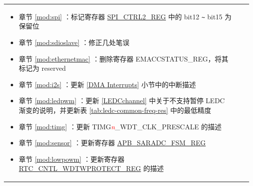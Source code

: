 \begin{longtable}[l]{ | m{2cm} | m{1.5cm} | m{12cm} | }
\begin{itemize}
    \item 章节 \ref{mod:spi} \textit{\nameref{mod:spi}}：标记寄存器 \hyperlink{regdesc:SPICTRL2REG}{SPI\_CTRL2\_REG} 中的 bit12 \verb+~+ bit15 为保留位 %

    \item 章节 \ref{mod:sdioslave} \textit{\nameref{mod:sdioslave}}：修正几处笔误

    \item 章节 \ref{mod:ethernetmac} \textit{\nameref{mod:ethernetmac}}：删除寄存器 EMACCSTATUS\_REG，将其标记为 reserved %

    \item 章节 \ref{mod:i2s} \textit{\nameref{mod:i2s}}：更新 \ref{DMA Interrupts} 小节中的中断描述 %

    \item 章节 \ref{mod:ledpwm} \textit{\nameref{mod:ledpwm}}：更新 \ref{LEDCchannel} 中关于不支持暂停 LEDC 渐变的说明，并更新表 \ref{tab:ledc-common-freq-res} 中的最低精度  %

    \item 章节 \ref{mod:timg} \textit{\nameref{mod:timg}}：更新 TIMG\textcolor{red}{\it{n}}\_WDT\_CLK\_PRESCALE 的描述 %

    \item 章节 \ref{mod:sensor} \textit{\nameref{mod:sensor}}：更新寄存器 \hyperlink{regdesc:APBSARADCFSMREG}{APB\_SARADC\_FSM\_REG} %

    \item 章节 \ref{mod:lowpowm} \textit{\nameref{mod:lowpowm}}：更新寄存器 \hyperref[regdesc:RTCCNTLWDTWPROTECTREG]{RTC\_CNTL\_WDTWPROTECT\_REG} 的描述 %


\end{itemize}
\end{longtable}
